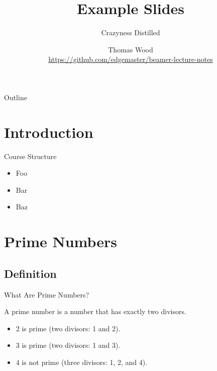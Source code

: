 \usepackage{lipsum}

\title{Example Slides}
\subtitle{Crazyness Distilled}
\author[Thomas Wood]{Thomas Wood \\ \url{https://github.com/edgemaster/beamer-lecture-notes}}
\institute{}
\date{}



\begin{frame}
  \maketitle
\end{frame}

\begin{frame}{Outline}
  \tableofcontents
\end{frame}

\section{Introduction}
\begin{frame}{Course Structure}
  \begin{itemize}
    \item Foo
    \item Bar
    \item Baz
  \end{itemize}
\end{frame}
\lipsum[1]   %


\section{Prime Numbers}
\subsection{Definition}
\begin{frame}{What Are Prime Numbers?}
  \begin{definition}
    A \alert{prime number} is a number that has exactly two divisors.
  \end{definition}
  \begin{example}
    \begin{itemize}
      \item 2 is prime (two divisors: 1 and 2).
      \item 3 is prime (two divisors: 1 and 3).
      \item 4 is not prime (\alert{three} divisors: 1, 2, and 4).
    \end{itemize}
  \end{example}
\end{frame}

